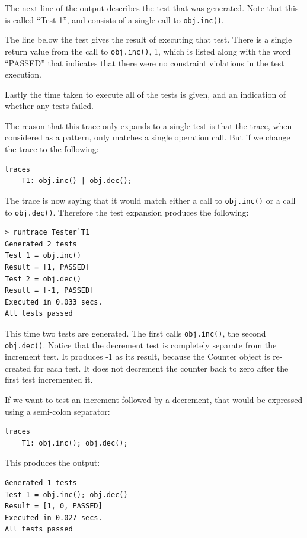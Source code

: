 \documentclass{overturerepchap}
\begin{document}
The next line of the output describes the test that was generated. Note that
this is called ``Test 1'', and consists of a single call to \texttt{obj.inc()}.

The line below the test gives the result of executing that test. There is a
single return value from the call to \texttt{obj.inc()}, 1, which is listed
along with the word ``PASSED'' that indicates that there were no constraint violations
in the test execution.

Lastly the time taken to execute all of the tests is given, and an indication of
whether any tests failed.

The reason that this trace only expands to a single test is that the trace, when
considered as a pattern, only matches a single operation call. But if we change
the trace to the following:

\small
\begin{lstlisting}
traces
    T1: obj.inc() | obj.dec();
\end{lstlisting}
\normalsize

The trace is now saying that it would match either a call to \texttt{obj.inc()}
or a call to \texttt{obj.dec()}. Therefore the test expansion produces the
following:

\begin{verbatim}
> runtrace Tester`T1
Generated 2 tests
Test 1 = obj.inc()
Result = [1, PASSED]
Test 2 = obj.dec()
Result = [-1, PASSED]
Executed in 0.033 secs. 
All tests passed
\end{verbatim}

This time two tests are generated. The first calls \texttt{obj.inc()}, the
second \texttt{obj.dec()}. Notice that the decrement test is completely separate
from the increment test. It produces -1 as its result, because the Counter
object is re-created for each test. It does not decrement the counter back to
zero after the first test incremented it.

If we want to test an increment followed by a decrement, that would be expressed
using a semi-colon separator:

\small
\begin{lstlisting}
traces
    T1: obj.inc(); obj.dec();
\end{lstlisting}
\normalsize

This produces the output:

\small
\begin{verbatim}
Generated 1 tests
Test 1 = obj.inc(); obj.dec()
Result = [1, 0, PASSED]
Executed in 0.027 secs. 
All tests passed
\end{verbatim}
\normalsize
\end{document}
